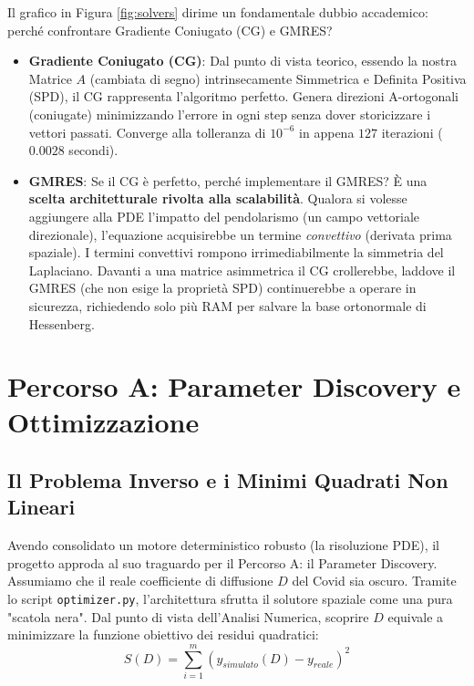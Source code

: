 \documentclass[12pt,a4paper]{report}
\begin{document}
Il grafico in Figura \ref{fig:solvers} dirime un fondamentale dubbio accademico: perché confrontare Gradiente Coniugato (CG) e GMRES?
\begin{itemize}
    \item \textbf{Gradiente Coniugato (CG)}: Dal punto di vista teorico, essendo la nostra Matrice $A$ (cambiata di segno) intrinsecamente Simmetrica e Definita Positiva (SPD), il CG rappresenta l'algoritmo perfetto. Genera direzioni A-ortogonali (coniugate) minimizzando l'errore in ogni step senza dover storicizzare i vettori passati. Converge alla tolleranza di $10^{-6}$ in appena $127$ iterazioni ($0.0028$ secondi).
    \item \textbf{GMRES}: Se il CG è perfetto, perché implementare il GMRES? È una \textbf{scelta architetturale rivolta alla scalabilità}. Qualora si volesse aggiungere alla PDE l'impatto del pendolarismo (un campo vettoriale direzionale), l'equazione acquisirebbe un termine \textit{convettivo} (derivata prima spaziale). I termini convettivi rompono irrimediabilmente la simmetria del Laplaciano. Davanti a una matrice asimmetrica il CG crollerebbe, laddove il GMRES (che non esige la proprietà SPD) continuerebbe a operare in sicurezza, richiedendo solo più RAM per salvare la base ortonormale di Hessenberg.
\end{itemize}


\chapter{Percorso A: Parameter Discovery e Ottimizzazione}

\section{Il Problema Inverso e i Minimi Quadrati Non Lineari}
Avendo consolidato un motore deterministico robusto (la risoluzione PDE), il progetto approda al suo traguardo per il Percorso A: il Parameter Discovery. 
Assumiamo che il reale coefficiente di diffusione $D$ del Covid sia oscuro. Tramite lo script \texttt{optimizer.py}, l'architettura sfrutta il solutore spaziale come una pura "scatola nera".
Dal punto di vista dell'Analisi Numerica, scoprire $D$ equivale a minimizzare la funzione obiettivo dei residui quadratici:
\begin{equation}
S(D) = \sum_{i=1}^{m} \left( y_{simulato}(D) - y_{reale} \right)^2
\end{equation}
\end{document}
